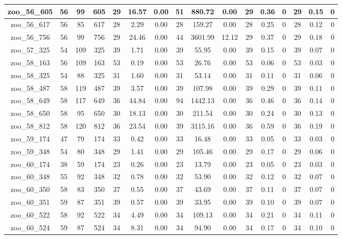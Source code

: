 \begin{landscape}
\begin{longtable}{|c|c|c|c|c|c|c|c|c|c|c|c|c|c|c|c|}
zoo\_56\_605 & 56 & 99 & 605 & 29 & 16.57 & 0.00 & 51 & 880.72 & 0.00 & 29 & 0.36 & 0 & 29 & 0.15 & 0 \\ \hline 
zoo\_56\_617 & 56 & 85 & 617 & 28 & 2.29 & 0.00 & 28 & 159.27 & 0.00 & 28 & 0.25 & 0 & 28 & 0.12 & 0 \\ \hline 
zoo\_56\_756 & 56 & 99 & 756 & 29 & 24.46 & 0.00 & 44 & 3601.99 & 12.12 & 29 & 0.37 & 0 & 29 & 0.18 & 0 \\ \hline 
zoo\_57\_325 & 54 & 109 & 325 & 39 & 1.71 & 0.00 & 39 & 55.95 & 0.00 & 39 & 0.15 & 0 & 39 & 0.07 & 0 \\ \hline 
zoo\_58\_163 & 56 & 109 & 163 & 53 & 0.19 & 0.00 & 53 & 26.76 & 0.00 & 53 & 0.06 & 0 & 53 & 0.03 & 0 \\ \hline 
zoo\_58\_325 & 54 & 88 & 325 & 31 & 1.60 & 0.00 & 31 & 53.14 & 0.00 & 31 & 0.11 & 0 & 31 & 0.06 & 0 \\ \hline 
zoo\_58\_487 & 58 & 119 & 487 & 39 & 3.57 & 0.00 & 39 & 107.98 & 0.00 & 39 & 0.29 & 0 & 39 & 0.11 & 0 \\ \hline 
zoo\_58\_649 & 58 & 117 & 649 & 36 & 44.84 & 0.00 & 94 & 1442.13 & 0.00 & 36 & 0.46 & 0 & 36 & 0.14 & 0 \\ \hline 
zoo\_58\_650 & 58 & 95 & 650 & 30 & 18.13 & 0.00 & 30 & 211.54 & 0.00 & 30 & 0.24 & 0 & 30 & 0.13 & 0 \\ \hline 
zoo\_58\_812 & 58 & 120 & 812 & 36 & 23.54 & 0.00 & 39 & 3115.16 & 0.00 & 36 & 0.59 & 0 & 36 & 0.19 & 0 \\ \hline 
zoo\_59\_174 & 47 & 79 & 174 & 33 & 0.42 & 0.00 & 33 & 16.48 & 0.00 & 33 & 0.05 & 0 & 33 & 0.03 & 0 \\ \hline 
zoo\_59\_348 & 54 & 80 & 348 & 29 & 1.41 & 0.00 & 29 & 105.46 & 0.00 & 29 & 0.17 & 0 & 29 & 0.06 & 0 \\ \hline 
zoo\_60\_174 & 38 & 59 & 174 & 23 & 0.26 & 0.00 & 23 & 13.79 & 0.00 & 23 & 0.05 & 0 & 23 & 0.03 & 0 \\ \hline 
zoo\_60\_348 & 55 & 92 & 348 & 32 & 0.78 & 0.00 & 32 & 53.90 & 0.00 & 32 & 0.12 & 0 & 32 & 0.07 & 0 \\ \hline 
zoo\_60\_350 & 58 & 83 & 350 & 37 & 0.55 & 0.00 & 37 & 43.69 & 0.00 & 37 & 0.11 & 0 & 37 & 0.07 & 0 \\ \hline 
zoo\_60\_351 & 59 & 87 & 351 & 39 & 0.57 & 0.00 & 39 & 33.95 & 0.00 & 39 & 0.10 & 0 & 39 & 0.07 & 0 \\ \hline 
zoo\_60\_522 & 58 & 92 & 522 & 34 & 4.49 & 0.00 & 34 & 109.13 & 0.00 & 34 & 0.21 & 0 & 34 & 0.11 & 0 \\ \hline 
zoo\_60\_524 & 59 & 87 & 524 & 34 & 8.31 & 0.00 & 34 & 94.90 & 0.00 & 34 & 0.17 & 0 & 34 & 0.10 & 0 \\ \hline 

\end{longtable}
\end{landscape}
